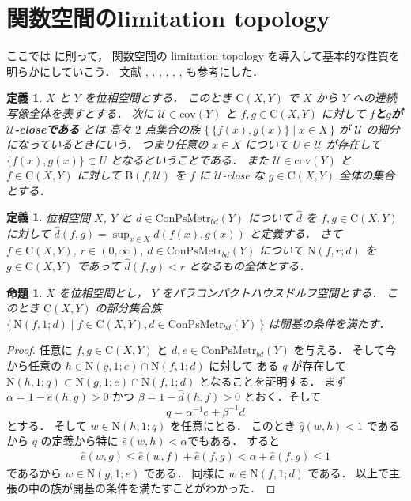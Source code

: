 \documentclass[leqno, a4paper, 12pt]{jsarticle}
\numberwithin{equation}{section}
\newtheorem{prop}[thm]{命題}
\newtheorem{df}[thm]{定義}
\newcommand{\yocov}[1]{\mathrm{cov}(#1)}
\newcommand{\yocovfont}[1]{\mathscr{#1}}
\newcommand{\yomapl}[2]{\mathrm{C}(#1, #2)}
\newcommand{\yonbset}[2]{\mathrm{B}(#1, #2)}
\newcommand{\yonbsetq}[3]{\mathrm{N}(#1, #2; #3)}
\newcommand{\yosupmet}[1]{\hat{#1}}
\newcommand{\yocbmet}[1]{\mathrm{ConPsMetr}_{bd}(#1)}
\begin{document}
\section{関数空間のlimitation topology}

ここでは
\cite{zbMATH03734780}
に則って，
関数空間の
limitation topology
を導入して基本的な性質を明らかにしていこう．
文献
\cite{MR3099433}, 
\cite{MR4179591}, 
\cite{McAuley1979SHRINKABLEDC}, 
\cite{arXiv:2103.02977}, 
\cite{zbMATH04128043}, 
\cite{zbMATH03994517}, 
\cite{zbMATH06863960}
も参考にした．



\begin{df}
$X$
と
$Y$
を位相空間とする．
このとき
$\yomapl{X}{Y}$
で
$X$
から
$Y$
への連続写像全体を表すとする．
次に
$\yocovfont{U}\in \yocov{Y}$
と
$f, g\in \yomapl{X}{Y}$
に対して
\textbf{$f$と$g$が$\yocovfont{U}$-closeである}
とは
高々
$2$
点集合の族
$\{\, \{f(x), g(x)\}\mid x\in X\, \}$
が
$\yocovfont{U}$
の細分になっているときにいう．
つまり任意の
$x\in X$
について
$U\in \yocovfont{U}$
が存在して
$\{f(x), g(x)\}\subset U$
となるということである．
また
$\yocovfont{U}\in \yocov{Y}$
と
$f\in \yomapl{X}{Y}$
に対して
$\yonbset{f}{\yocovfont{U}}$
を
$f$
に
$\yocovfont{U}$-close 
な
$g\in \yomapl{X}{Y}$
全体の集合とする．
\end{df}

\begin{df}
位相空間
$X$, 
$Y$
と
$d\in \yocbmet{Y}$
について
$\yosupmet{d}$
を
$f, g\in\yomapl{X}{Y}$
に対して
$\yosupmet{d}(f, g)=\sup_{x\in X}d(f(x), g(x))$
と定義する．
さて
$f\in \yomapl{X}{Y}$, 
$r\in (0, \infty)$, 
$d\in \yocbmet{Y}$
について
$\yonbsetq{f}{r}{d}$
を
$g\in \yomapl{X}{Y}$
であって
$\yosupmet{d}(f, g)<r$
となるもの全体とする．
\end{df}


\begin{prop}\label{prop:bbopbasisaaa}
$X$
を位相空間とし，
$Y$
をパラコンパクトハウスドルフ空間とする．
このとき
$\yomapl{X}{Y}$
の部分集合族
$\{\, \yonbsetq{f}{1}{d}\mid f\in \yomapl{X}{Y}, 
d\in \yocbmet{Y}\, \}$
は開基の条件を満たす．
\end{prop}
\begin{proof}
任意に
$f, g\in \yomapl{X}{Y}$
と
$d, e\in \yocbmet{Y}$
を与える．
そして今から任意の
$h\in \yonbsetq{g}{1}{e}\cap\yonbsetq{f}{1}{d}$
に対して
ある
$q$
が存在して
$\yonbsetq{h}{1}{q}\subset  \yonbsetq{g}{1}{e}\cap\yonbsetq{f}{1}{d}$
となることを証明する．
まず
$\alpha=1-\yosupmet{e}(h, g)>0$
かつ
$\beta=1-\yosupmet{d}(h, f)>0$
とおく．そして
\[
q=\alpha^{-1}e+\beta^{-1}d
\]とする．
そして
$w\in \yonbsetq{h}{1}{q}$
を任意にとる．
このとき
$\yosupmet{q}(w, h)<1$
であるから
$q$
の定義から特に
$\yosupmet{e}(w, h)<\alpha $でもある．
すると
\begin{align*}
\yosupmet{e}(w, g)\le \yosupmet{e}(w, f)+\yosupmet{e}(f, g)<\alpha+\yosupmet{e}(f, g)\le 1
\end{align*}
であるから
$w\in \yonbsetq{g}{1}{e}$
である．
同様に
$w\in \yonbsetq{f}{1}{d}$
である．
以上で主張の中の族が開基の条件を満たすことがわかった．
\end{proof}
\end{document}
